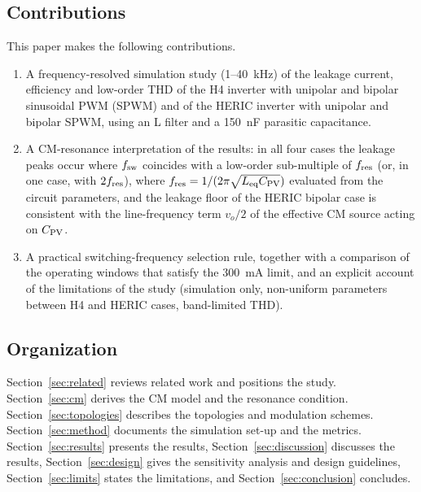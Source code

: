 \subsection{Contributions}
This paper makes the following contributions.
\begin{enumerate}
  \item A frequency-resolved simulation study (1--40~kHz) of the leakage current, efficiency and low-order THD of the H4 inverter with unipolar and bipolar sinusoidal PWM (SPWM) and of the HERIC inverter with unipolar and bipolar SPWM, using an L filter and a 150~nF parasitic capacitance.
  \item A CM-resonance interpretation of the results: in all four cases the leakage peaks occur where $f_{\mathrm{sw}}$ coincides with a low-order sub-multiple of $f_{\mathrm{res}}$ (or, in one case, with $2f_{\mathrm{res}}$), where $f_{\mathrm{res}}=1/(2\pi\sqrt{L_{\mathrm{eq}}C_{\mathrm{PV}}})$ evaluated from the circuit parameters, and the leakage floor of the HERIC bipolar case is consistent with the line-frequency term $v_o/2$ of the effective CM source acting on $C_{\mathrm{PV}}$.
  \item A practical switching-frequency selection rule, together with a comparison of the operating windows that satisfy the 300~mA limit, and an explicit account of the limitations of the study (simulation only, non-uniform parameters between H4 and HERIC cases, band-limited THD).
\end{enumerate}

\subsection{Organization}
Section~\ref{sec:related} reviews related work and positions the study. Section~\ref{sec:cm} derives the CM model and the resonance condition. Section~\ref{sec:topologies} describes the topologies and modulation schemes. Section~\ref{sec:method} documents the simulation set-up and the metrics. Section~\ref{sec:results} presents the results, Section~\ref{sec:discussion} discusses the results, Section~\ref{sec:design} gives the sensitivity analysis and design guidelines, Section~\ref{sec:limits} states the limitations, and Section~\ref{sec:conclusion} concludes.
